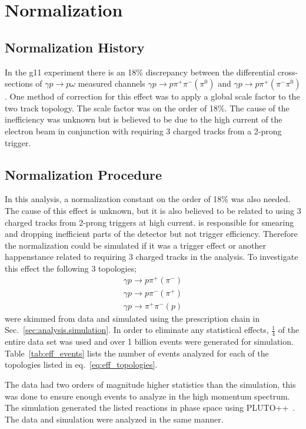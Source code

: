 \section{Normalization}\label{sec:results.normalization}
\subsection{Normalization History}
In the g11 experiment there is an 18\% discrepancy between the differential cross-sections of $\gamma p \rightarrow p \omega$ measured channels $\gamma p \rightarrow p \pi^+ \pi^- (\pi^0)$ and $\gamma p \rightarrow p \pi^+ (\pi^- \pi^0)$. One method of correction for this effect was to apply a global scale factor to the two track topology. The scale factor was on the order of 18\%. The cause of the inefficiency was unknown but is believed to be due to the high current of the electron beam in conjunction with requiring 3 charged tracks from a 2-prong trigger.
\subsection{ Normalization Procedure}
In this analysis, a normalization constant on the order of 18\% was also needed. The cause of this effect is unknown, but it is also believed to be related to using 3 charged tracks from 2-prong triggers at high current.  is responsible for smearing and dropping inefficient parts of the detector but not trigger efficiency. Therefore the normalization could be simulated if it was a trigger effect or another happenstance related to requiring 3 charged tracks in the analysis. To investigate this effect the following 3 topologies; 
\begin{align}\label{eq:eff_topologies}
\gamma p \rightarrow p \pi^+ (\pi^-) \nonumber\\
\gamma p \rightarrow p \pi^- (\pi^+)  \nonumber\\
\gamma p \rightarrow \pi^+ \pi^- (p)
\end{align}  
were skimmed from data and simulated using the prescription chain in Sec.~\ref{sec:analysis.simulation}. In order to eliminate any statistical effects, $\frac{1}{4}$ of the entire  data set was used and over 1 billion events were generated for simulation. Table~\ref{tab:eff_events} lists the number of events analyzed for each of the topologies listed in eq.~\ref{eq:eff_topologies}.

The data had two orders of magnitude higher statistics than the simulation, this was done to ensure enough events to analyze in the high momentum spectrum. The simulation generated the listed reactions in phase space using PLUTO++~\cite{PLUTO}. The data and simulation were analyzed in the same manner.

